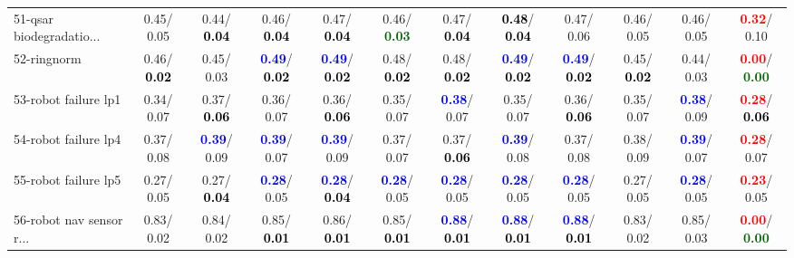 \begin{table}[h]
\begin{center}
{\begin{tabular}{lc|c|c|c|c|c|c|c|c|c|c}
51-qsar biodegradatio... &   0.45/  0.05 &   0.44/\textcolor{black}{\textbf{  0.04}} &   0.46/\textcolor{black}{\textbf{  0.04}} &   0.47/\textcolor{black}{\textbf{  0.04}} &   0.46/\textcolor{darkgreen}{\textbf{  0.03}} &   0.47/\textcolor{black}{\textbf{  0.04}} & \textcolor{black}{\textbf{  0.48}}/\textcolor{black}{\textbf{  0.04}} &   0.47/  0.06 &   0.46/  0.05 &   0.46/  0.05 & \textcolor{red}{\textbf{  0.32}}/  0.10 \\
52-ringnorm &   0.46/\textcolor{black}{\textbf{  0.02}} &   0.45/  0.03 & \textcolor{blue}{\textbf{  0.49}}/\textcolor{black}{\textbf{  0.02}} & \textcolor{blue}{\textbf{  0.49}}/\textcolor{black}{\textbf{  0.02}} &   0.48/\textcolor{black}{\textbf{  0.02}} &   0.48/\textcolor{black}{\textbf{  0.02}} & \textcolor{blue}{\textbf{  0.49}}/\textcolor{black}{\textbf{  0.02}} & \textcolor{blue}{\textbf{  0.49}}/\textcolor{black}{\textbf{  0.02}} &   0.45/\textcolor{black}{\textbf{  0.02}} &   0.44/  0.03 & \textcolor{red}{\textbf{  0.00}}/\textcolor{darkgreen}{\textbf{  0.00}} \\
53-robot failure lp1 &   0.34/  0.07 &   0.37/\textcolor{black}{\textbf{  0.06}} &   0.36/  0.07 &   0.36/\textcolor{black}{\textbf{  0.06}} &   0.35/  0.07 & \textcolor{blue}{\textbf{  0.38}}/  0.07 &   0.35/  0.07 &   0.36/\textcolor{black}{\textbf{  0.06}} &   0.35/  0.07 & \textcolor{blue}{\textbf{  0.38}}/  0.09 & \textcolor{red}{\textbf{  0.28}}/\textcolor{black}{\textbf{  0.06}} \\ \hline
54-robot failure lp4 &   0.37/  0.08 & \textcolor{blue}{\textbf{  0.39}}/  0.09 & \textcolor{blue}{\textbf{  0.39}}/  0.07 & \textcolor{blue}{\textbf{  0.39}}/  0.09 &   0.37/  0.07 &   0.37/\textcolor{black}{\textbf{  0.06}} & \textcolor{blue}{\textbf{  0.39}}/  0.08 &   0.37/  0.08 &   0.38/  0.09 & \textcolor{blue}{\textbf{  0.39}}/  0.07 & \textcolor{red}{\textbf{  0.28}}/  0.07 \\
55-robot failure lp5 &   0.27/  0.05 &   0.27/\textcolor{black}{\textbf{  0.04}} & \textcolor{blue}{\textbf{  0.28}}/  0.05 & \textcolor{blue}{\textbf{  0.28}}/\textcolor{black}{\textbf{  0.04}} & \textcolor{blue}{\textbf{  0.28}}/  0.05 & \textcolor{blue}{\textbf{  0.28}}/  0.05 & \textcolor{blue}{\textbf{  0.28}}/  0.05 & \textcolor{blue}{\textbf{  0.28}}/  0.05 &   0.27/  0.05 & \textcolor{blue}{\textbf{  0.28}}/  0.05 & \textcolor{red}{\textbf{  0.23}}/  0.05 \\
56-robot nav sensor r... &   0.83/  0.02 &   0.84/  0.02 &   0.85/\textcolor{black}{\textbf{  0.01}} &   0.86/\textcolor{black}{\textbf{  0.01}} &   0.85/\textcolor{black}{\textbf{  0.01}} & \textcolor{blue}{\textbf{  0.88}}/\textcolor{black}{\textbf{  0.01}} & \textcolor{blue}{\textbf{  0.88}}/\textcolor{black}{\textbf{  0.01}} & \textcolor{blue}{\textbf{  0.88}}/\textcolor{black}{\textbf{  0.01}} &   0.83/  0.02 &   0.85/  0.03 & \textcolor{red}{\textbf{  0.00}}/\textcolor{darkgreen}{\textbf{  0.00}} \\

\end{tabular}}
\end{center}
\end{table}
